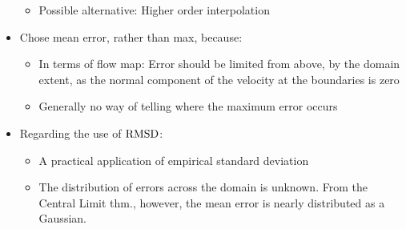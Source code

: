 \begin{framed}
\begin{itemize}
            \begin{itemize}
                \item Possible alternative: Higher order interpolation
            \end{itemize}
            \item Chose mean error, rather than max, because:
                \begin{itemize}
                    \item In terms of flow map: Error should be limited from above, by the domain extent, as the normal component
                        of the velocity at the boundaries is zero
                        \item Generally no way of telling where the maximum error occurs
                \end{itemize}
                \item Regarding the use of $\operatorname{RMSD}$:
                    \begin{itemize}
                        \item A practical application of empirical standard deviation
                            \item The distribution of errors across the domain is unknown. From the Central Limit thm., however,
                                the mean error is nearly distributed as a Gaussian.
                    \end{itemize}
    \end{itemize}
\end{framed}
